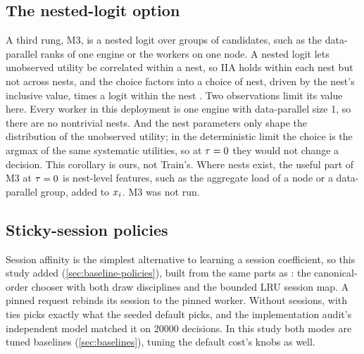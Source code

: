 \subsection{The nested-logit option}
\label{sec:nested}

A third rung, M3, is a nested logit over groups of candidates, such as the data-parallel
ranks of one engine or the workers on one node. A nested logit lets unobserved utility be
correlated within a nest, so IIA holds within each nest but not across nests, and the choice
factors into a choice of nest, driven by the nest's inclusive value, times a logit within the nest
\citep{train2009gev}. Two observations limit its value here. Every worker in this deployment is one
engine with data-parallel size 1, so there are no nontrivial nests. And the nest parameters only
shape the distribution of the unobserved utility; in the deterministic limit the choice is the
argmax of the same systematic utilities, so at $\tau = 0$ they would not change a decision. This
corollary is ours, not Train's. Where nests exist, the useful part of M3 at $\tau = 0$ is
nest-level features, such as the aggregate load of a node or a data-parallel group, added to
$x_i$. M3 was not run.

\subsection{Sticky-session policies}
\label{sec:sticky}

Session affinity is the simplest alternative to learning a session coefficient, so this study
added  (\cref{sec:baseline-policies}), built from the same parts as \lc{}:
the canonical-order chooser with both draw disciplines and the bounded LRU session map. A pinned
request rebinds its session to the pinned worker. Without sessions,  with
 ties picks exactly what the seeded default picks, and the implementation audit's
independent model matched it on \num{20000} decisions. In this study both modes are tuned
baselines (\cref{sec:baselines}), tuning the default cost's knobs as well.

